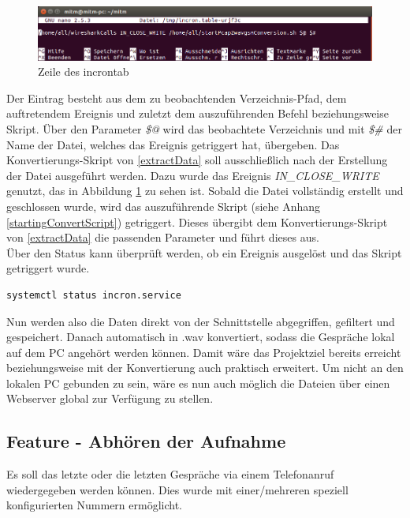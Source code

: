\begin{figure}[h] %
\centering
\includegraphics[width=15cm]{includes/incrontab}
\caption{Zeile des incrontab}
\label{fig:incrontab}
\end{figure}


Der Eintrag besteht aus dem zu beobachtenden Verzeichnis-Pfad, dem auftretendem Ereignis und zuletzt dem auszuführenden Befehl beziehungsweise Skript. Über den Parameter \textit{\$@}  wird das beobachtete Verzeichnis und mit \textit{\$\#} der Name der Datei, welches das Ereignis getriggert hat, übergeben. Das Konvertierungs-Skript von \ref{extractData} soll ausschließlich nach der Erstellung der Datei ausgeführt werden. Dazu wurde das Ereignis \textit{IN\_CLOSE\_WRITE} genutzt, das in Abbildung \ref{fig:incrontab} zu sehen ist. Sobald die Datei vollständig erstellt und geschlossen wurde, wird das auszuführende Skript (siehe Anhang \ref{startingConvertScript}) getriggert. Dieses übergibt dem Konvertierungs-Skript von \ref{extractData} die passenden Parameter und führt dieses aus.\\

Über den Status kann überprüft werden, ob ein Ereignis ausgelöst und das Skript getriggert wurde.

\begin{lstlisting}
systemctl status incron.service
\end{lstlisting}


Nun werden also die Daten direkt von der Schnittstelle abgegriffen, gefiltert und gespeichert. Danach automatisch in .wav konvertiert, sodass die Gespräche lokal auf dem PC angehört werden können. Damit wäre das Projektziel bereits erreicht beziehungsweise mit der Konvertierung auch praktisch erweitert. Um nicht an den lokalen PC gebunden zu sein, wäre es nun auch möglich die Dateien über einen Webserver global zur Verfügung zu stellen.

\subsection{Feature - Abhören der Aufnahme}
Es soll das letzte oder die letzten Gespräche via einem Telefonanruf wiedergegeben werden können. Dies wurde mit einer/mehreren speziell konfigurierten Nummern ermöglicht.

